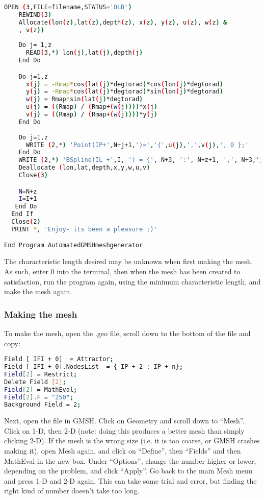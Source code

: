 \begin{lstlisting}[language = Bash]
    OPEN (3,FILE=filename,STATUS='OLD')
    REWIND(3)
    Allocate(lon(z),lat(z),depth(z), x(z), y(z), u(z), w(z) &
    , v(z))
       
    Do j= 1,z
      READ(3,*) lon(j),lat(j),depth(j)
    End Do

    Do j=1,z
      x(j) = -Rmap*cos(lat(j)*degtorad)*cos(lon(j)*degtorad)
      y(j) = -Rmap*cos(lat(j)*degtorad)*sin(lon(j)*degtorad)
      w(j) = Rmap*sin(lat(j)*degtorad)
      u(j) = ((Rmap) / (Rmap+(w(j))))*x(j)
      v(j) = ((Rmap) / (Rmap+(w(j))))*y(j)
    End Do
  
    Do j=1,z
      WRITE (2,*) 'Point(IP+',N+j+1,')=','{',u(j),',',v(j),', 0 };'
    End Do
    WRITE (2,*) 'BSpline(IL +',I, ') = {', N+3, ':', N+z+1, ',', N+3,'};'
    Deallocate (lon,lat,depth,x,y,w,u,v)
    Close(3)

    N=N+z 
    I=I+1
   End Do
  End If
  Close(2)
  PRINT *, 'Enjoy- its been a pleasure ;)'

End Program AutomatedGMSHmeshgenerator
\end{lstlisting}

The characteristic length desired may be unknown when first making the mesh. As such, enter 0 into the terminal, 
then when the mesh has been created to satisfaction, run the program again, using the minimum characteristic length, 
and make the mesh again.

\subsubsection{Making the mesh}

To make the mesh, open the .geo file, scroll down to the bottom of the file and copy:

\begin{lstlisting}[language = Bash]
Field [ IFI + 0]  = Attractor; 
Field [ IFI + 0].NodesList  = { IP + 2 : IP + n}; 
Field[2] = Restrict; 
Delete Field [2]; 
Field[2] = MathEval; 
Field[2].F = "250"; 
Background Field = 2; 
\end{lstlisting}

Next, open the file in GMSH. Click on Geometry and scroll down to “Mesh”. Click on 1-D, then 2-D (note: doing 
this produces a better mesh than simply clicking 2-D). If the mesh is the wrong size (i.e. it is too coarse, or 
GMSH crashes making it), open Mesh again, and click on “Define”, then “Fields” and then MathEval in the new box.
Under “Options”, change the number higher or lower, depending on the problem, and click “Apply”.  Go back to the
main Mesh menu and press 1-D and 2-D again. This can take some trial and error, but finding the right kind of number
 doesn't take too long. 

